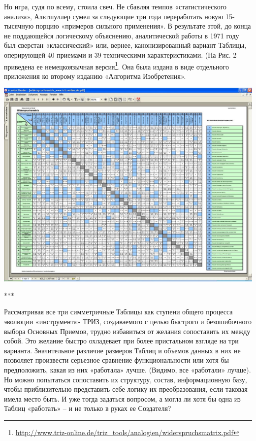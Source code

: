 \documentclass[11pt,a4paper]{article}
\begin{document}
Но игра, судя по всему, стоила свеч. Не сбавляя темпов «статистического
анализа», Альтшуллер сумел за следующие три года переработать новую
15-тысячную порцию «примеров сильного применения». В результате этой, до конца
не поддающейся логическому объяснению, аналитической работы в 1971 году был
сверстан «классический» или, вернее, канонизированный вариант Таблицы,
оперирующей 40 приемами и 39 техническими характеристиками. (На Рис. 2
приведена ее немецкоязычная
версия\footnote{\url{http://www.triz-online.de/triz_tools/analogien/widerspruchsmatrix.pdf}}.
Она была издана в виде отдельного приложения ко второму изданию «Алгоритма
Изобретения». \cite{Altshuller1973}

\begin{center}
  \includegraphics[width=.8\textwidth]{./14.jpg} 
\end{center}

\begin{center}
  ***
\end{center}

Рассматривая все три симметричные Таблицы как ступени общего процесса эволюции
«инструмента» ТРИЗ, создаваемого с целью быстрого и безошибочного выбора
Основных Приемов, трудно избавиться от желания сопоставить их между собой. Это
желание быстро охладевает при более пристальном взгляде на три варианта.
Значительное различие размеров Таблиц и объемов данных в них не позволяет
произвести серьезное сравнение функциональности или хотя бы предположить,
какая из них «работала» лучше. (Видимо, все «работали» лучше). Но можно
попытаться сопоставить их структуру, состав, информационную базу, чтобы
приблизительно представить себе логику их преобразования, если таковая имела
место быть. И уже тогда задаться вопросом, а могла ли хотя бы одна из Таблиц
«работать» -- и не только в руках ее Создателя?
\end{document}
